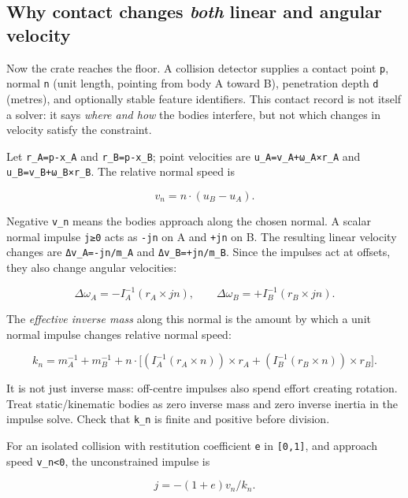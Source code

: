 \subsection{\texorpdfstring{Why contact changes \emph{both} linear and angular velocity}{Why contact changes both linear and angular velocity}}\label{06-engine-ii-ch033-why-contact-changes-both-linear-and-angular-velocity}

\hypertarget{06-engine-ii-ch033-why-contact-changes-both-linear-and-angular-velocity}{}

Now the crate reaches the floor. A collision detector supplies a contact point \texttt{p}, normal \texttt{n} (unit length, pointing from body A toward B), penetration depth \texttt{d} (metres), and optionally stable feature identifiers. This contact record is not itself a solver: it says \emph{where and how} the bodies interfere, but not which changes in velocity satisfy the constraint.

Let \texttt{r\_A=p-x\_A} and \texttt{r\_B=p-x\_B}; point velocities are \texttt{u\_A=v\_A+ω\_A×r\_A} and \texttt{u\_B=v\_B+ω\_B×r\_B}. The relative normal speed is

\[
v_n=n\cdot(u_B-u_A).
\]

Negative \texttt{v\_n} means the bodies approach along the chosen normal. A scalar normal impulse \texttt{j≥0} acts as \texttt{-jn} on A and \texttt{+jn} on B. The resulting linear velocity changes are \texttt{Δv\_A=-jn/m\_A} and \texttt{Δv\_B=+jn/m\_B}. Since the impulses act at offsets, they also change angular velocities:

\[
\Delta\omega_A=-I_A^{-1}(r_A\times jn),\qquad
\Delta\omega_B=+I_B^{-1}(r_B\times jn).
\]

The \emph{effective inverse mass} along this normal is the amount by which a unit normal impulse changes relative normal speed:

\[
k_n=m_A^{-1}+m_B^{-1}
+n\cdot\Big[
(I_A^{-1}(r_A\times n))\times r_A
+(I_B^{-1}(r_B\times n))\times r_B
\Big].
\]

It is not just inverse mass: off-centre impulses also spend effort creating rotation. Treat static/kinematic bodies as zero inverse mass and zero inverse inertia in the impulse solve. Check that \texttt{k\_n} is finite and positive before division.

For an isolated collision with restitution coefficient \texttt{e} in \texttt{{[}0,1{]}}, and approach speed \texttt{v\_n\textless{}0}, the unconstrained impulse is

\[
j=-(1+e)v_n/k_n.
\]

